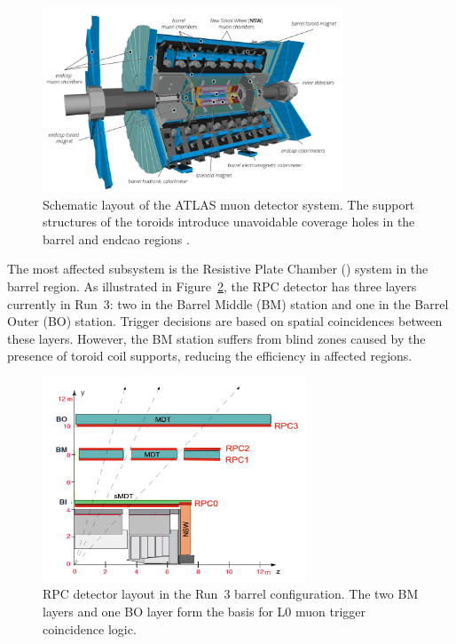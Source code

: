 \begin{figure}[htbp]
  \centering
  \includegraphics[width=0.8\textwidth]{figs/chapter4/ATLAS_muon_detectors_and_toroids3.png}
  \caption{Schematic layout of the ATLAS muon detector system. The support structures of the toroids introduce unavoidable coverage holes in the barrel and endcao regions \cite{ATLASRun3Detector}.}
  \label{fig:ATLAS_muon_geometry}
\end{figure}

The most affected subsystem is the Resistive Plate Chamber (\RPC) system in the barrel region. As illustrated in Figure~\ref{fig:RPC_structure}, the RPC detector has three layers currently in Run~3: two in the Barrel Middle (BM) station and one in the Barrel Outer (BO) station. Trigger decisions are based on spatial coincidences between these layers. However, the BM station suffers from blind zones caused by the presence of toroid coil supports, reducing the efficiency in affected regions.

\begin{figure}[htbp]
  \centering
  \includegraphics[width=0.7\textwidth]{figs/chapter4/RPC_detector_structure.png}
  \caption{RPC detector layout in the Run~3 barrel configuration. The two BM layers and one BO layer form the basis for L0 muon trigger coincidence logic.}
  \label{fig:RPC_structure}
\end{figure}

